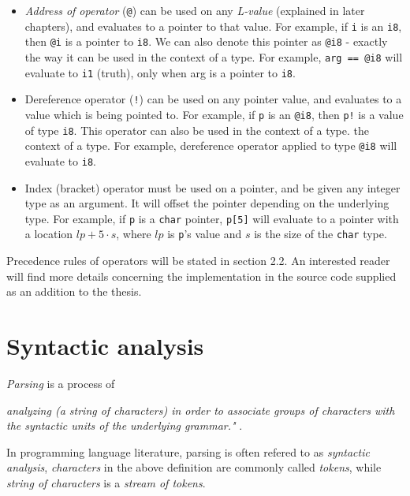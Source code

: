 \documentclass[times, utf8, diplomski]{fer}
\theoremstyle{definition}
\begin{document}
\begin{itemize}
    \item \textit{Address of operator} (\texttt{@}) can be used on any \textit{L-value} (explained
        in later chapters), and evaluates to a pointer to that value. For
        example, if \texttt{i} is an \texttt{i8}, then \texttt{@i} is a pointer
    to \texttt{i8}. We can also denote this pointer as \texttt{@i8} - exactly the way it can be used in 
    the context of a type. For example, \texttt{arg == @i8} will evaluate to \texttt{i1} (truth),
    only when arg is a pointer to \texttt{i8}.

    \item Dereference operator (\texttt{!}) can be used on any pointer value, 
        and evaluates to a value which is being pointed to.
        For example, if \texttt{p} is an \texttt{@i8}, then \texttt{p!} is a value of type \texttt{i8}.
    This operator can also be used in the context of a type.
    the context of a type. For example, dereference operator applied to type \texttt{@i8}
    will evaluate to \texttt{i8}.

    \item Index (bracket) operator must be used on a pointer, and be given any integer type as an argument.
        It will offset the pointer depending on the underlying type. For example, 
        if \texttt{p} is a \texttt{char} pointer, \texttt{p[5]} will evaluate to a pointer 
        with a location $lp+5\cdot s$, where $lp$ is \texttt{p}'s value and $s$ is the size 
        of the \texttt{char} type.
\end{itemize}

Precedence rules of operators will be stated in section 2.2. 
An interested reader will find more details concerning the implementation in
the source code supplied as an addition to the thesis.

\section{Syntactic analysis}

\textit{Parsing} is a process of 
\begin{center}
\textit{analyzing (a string of characters) in order to associate groups of
characters with the syntactic units of the underlying grammar."} \citep{c_parsing_def}. 
\end{center}

In programming language literature, parsing is often refered to as \textit{syntactic analysis},
\textit{characters} in the above definition are commonly called
\textit{tokens}, while \textit{string of characters} is a \textit{stream of tokens}.
\end{document}
